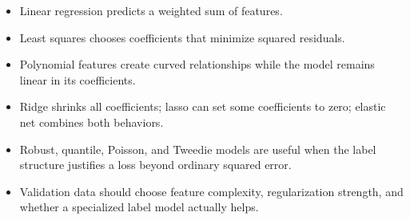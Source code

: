 \begin{chapterrecap}
\begin{itemize}
  \item Linear regression predicts a weighted sum of features.
  \item Least squares chooses coefficients that minimize squared residuals.
  \item Polynomial features create curved relationships while the model remains linear in its coefficients.
  \item Ridge shrinks all coefficients; lasso can set some coefficients to zero; elastic net combines both behaviors.
  \item Robust, quantile, Poisson, and Tweedie models are useful when the label structure justifies a loss beyond ordinary squared error.
  \item Validation data should choose feature complexity, regularization strength, and whether a specialized label model actually helps.
\end{itemize}
\end{chapterrecap}
